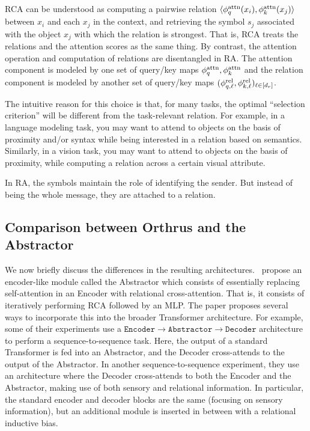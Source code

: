 RCA can be understood as computing a pairwise relation $\langle \phi_q^{\mathrm{attn}}(x_i), \phi_k^{\mathrm{attn}}(x_j) \rangle$ between $x_i$ and each $x_j$ in the context, and retrieving the symbol $s_j$ associated with the object $x_j$ with which the relation is strongest. That is, RCA treats the relations and the attention scores as the same thing. By contrast, the attention operation and computation of relations are disentangled in RA. The attention component is modeled by one set of query/key maps $\phi_q^{\mathrm{attn}}, \phi_k^{\mathrm{attn}}$ and the relation component is modeled by another set of query/key maps $(\phi_{q, \ell}^{\mathrm{rel}}, \phi_{k, \ell}^{\mathrm{rel}})_{\ell \in [d_r]}$.

The intuitive reason for this choice is that, for many tasks, the optimal ``selection criterion'' will be different from the task-relevant relation. For example, in a language modeling task, you may want to attend to objects on the basis of proximity and/or syntax while being interested in a relation based on semantics. Similarly, in a vision task, you may want to attend to objects on the basis of proximity, while computing a relation across a certain visual attribute.

In RA, the symbols maintain the role of identifying the sender. But instead of being the whole message, they are attached to a relation.

\subsection{Comparison between Orthrus and the Abstractor}

We now briefly discuss the differences in the resulting architectures.~\citet{altabaa2024abstractors} propose an encoder-like module called the Abstractor which consists of essentially replacing self-attention in an Encoder with relational cross-attention. That is, it consists of iteratively performing RCA followed by an MLP. The paper proposes several ways to incorporate this into the broader Transformer architecture. For example, some of their experiments use a $\texttt{Encoder} \to \texttt{Abstractor} \to \texttt{Decoder}$ architecture to perform a sequence-to-sequence task. Here, the output of a standard Transformer is fed into an Abstractor, and the Decoder cross-attends to the output of the Abstractor. In another sequence-to-sequence experiment, they use an architecture where the Decoder cross-attends to both the Encoder and the Abstractor, making use of both sensory and relational information. In particular, the standard encoder and decoder blocks are the same (focusing on sensory information), but an additional module is inserted in between with a relational inductive bias.

